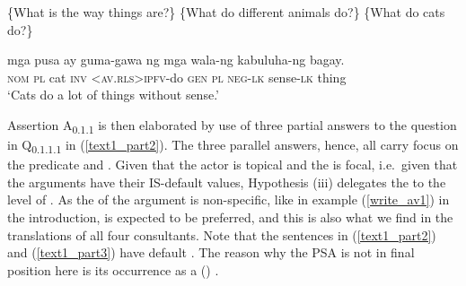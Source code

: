 \documentclass[output=paper,
,modfonts
,nonflat]{langsci/langscibook}
\begin{document}
\begin{exe}
\ex\label{text1_part1}
\begin{xlist}
 \{What is the way things are?\}
 \{What do different animals do?\} 
 \{What do cats do?\}
\end{xlist}
\begin{xlist}[{>}{>}> A\textsubscript{{0.1.1}}:]
 mga {pusa{\cb}\ctopic} ay {{\ob}g{\USSmaller}um{\USGreater}a-gawa} ng mga wala-ng {kabuluha-ng} {bagay{\cb}\focus{\cb}\sq}.\\
\textsc{\void{[[}nom} \textsc{pl} cat \textsc{inv} \textsc{\void{[}<av.rls>ipfv}-do \textsc{gen} \textsc{pl} \textsc{neg-lk}   sense-\textsc{lk}  thing\\
\glt `Cats do a lot of things without sense.'
\end{xlist}
\end{exe}

\noindent Assertion A\textsubscript{{0.1.1}} is then elaborated by use of three partial answers to the question in Q\textsubscript{{0.1.1.1}} in (\ref{text1_part2}). The three parallel answers, hence, all carry focus on the predicate and . Given that the actor is topical and the  is focal, i.e.\ given that the arguments have their IS-default values, Hypothesis (iii) delegates the  to the level of . As the  of the  argument is non-specific, like in example (\ref{write_av1}) in the introduction,  is expected to be preferred, and this is also what we find in the translations of all four consultants. Note that the sentences in (\ref{text1_part2}) and (\ref{text1_part3}) have default . The reason why the PSA is not in final position here is its occurrence as a () .  
\end{document}
